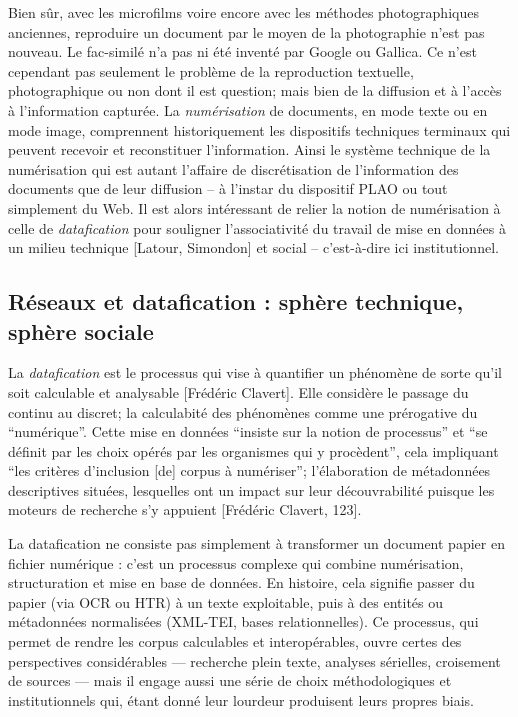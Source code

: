 Bien sûr, avec les microfilms voire encore avec les méthodes photographiques anciennes, reproduire un document par le moyen de la photographie n'est pas nouveau. Le fac-similé n'a pas ni été inventé par Google ou Gallica. Ce n'est cependant pas seulement le problème de la reproduction textuelle, photographique ou non dont il est question; mais bien de la diffusion et à l'accès à l'information capturée. La \emph{numérisation} de documents, en mode texte ou en mode image, comprennent historiquement les dispositifs techniques terminaux qui peuvent recevoir et reconstituer l'information. Ainsi le système technique de la numérisation qui est autant l'affaire de discrétisation de l'information des documents que de leur diffusion -- à l'instar du dispositif PLAO ou tout simplement du Web. Il est alors intéressant de relier la notion de numérisation à celle de \emph{datafication} pour souligner l'associativité du travail de mise en données à un milieu technique [Latour, Simondon] et social -- c'est-à-dire ici institutionnel.

\subsection{Réseaux et datafication : sphère technique, sphère sociale}

La \emph{datafication} est le processus qui vise à quantifier un phénomène de sorte qu'il soit calculable et analysable [Frédéric Clavert]. Elle considère le passage du continu au discret; la calculabité des phénomènes comme une prérogative du \enquote{numérique}. Cette mise en données \enquote{insiste sur la notion de processus} et \enquote{se définit par les choix opérés par les organismes qui y procèdent}, cela impliquant \enquote{les critères d'inclusion [de] corpus à numériser}; l'élaboration de métadonnées descriptives situées, lesquelles ont un impact sur leur découvrabilité puisque les moteurs de recherche s'y appuient [Frédéric Clavert, 123].

La datafication ne consiste pas simplement à transformer un document papier en fichier numérique : c’est un processus complexe qui combine numérisation, structuration et mise en base de données. En histoire, cela signifie passer du papier (via OCR ou HTR) à un texte exploitable, puis à des entités ou métadonnées normalisées (XML-TEI, bases relationnelles). Ce processus, qui permet de rendre les corpus calculables et interopérables, ouvre certes des perspectives considérables — recherche plein texte, analyses sérielles, croisement de sources — mais il engage aussi une série de choix méthodologiques et institutionnels qui, étant donné leur lourdeur produisent leurs propres biais.

